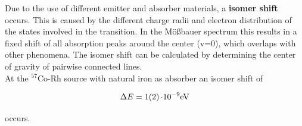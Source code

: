 

Due to the use of different emitter and absorber materials, a \textbf{isomer shift} occurs. This is caused by the different charge radii and electron distribution of the states involved in the transition.
 In the Mößbauer spectrum this results in a fixed shift of all absorption peaks around  the center (v=0), which overlaps with other phenomena. The isomer shift can be calculated by determining the center of gravity of pairwise connected lines. \\
At the $^{57}$Co-Rh source with natural iron as absorber an isomer shift of

\begin{equation}
\label{eq:isofe}
\Delta E = \SI{1 \pm 2}{\cdot 10^{-9} eV}
\end{equation}

occurs.
